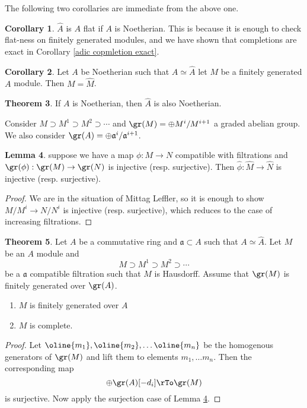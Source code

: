 \documentclass[12 pt]{article}
\theoremstyle{definition}
\newtheorem{thm}{Theorem}[section]
\newtheorem{cor}[thm]{Corollary}
\newtheorem{lemma}[thm]{Lemma}
\renewcommand{\(}{\left(}
\renewcommand{\)}{\right)}
\newcommand\fa{{\mathfrak a}}
\begin{document}
The following two corollaries are immediate from the above one.

\begin{cor}  $\hat{A}$ is $A$ flat if $A$ is Noetherian. This is because it is enough to check flat-ness on finitely generated modules, and we have shown that completions are exact in Corollary \ref{adic copmletion exact}.
\end{cor}


\begin{cor} Let $A$ be Noetherian such that $A \simeq \hat{A}$ let $M$ be a finitely generated $A$ module. Then $M=\hat{M}$.
\end{cor}


\begin{thm} If $A$ is Noetherian, then $\hat{A}$ is also Noetherian.
\end{thm}

Consider $M \supset M^1 \supset M^2 \supset \cdots$ and $\gr(M)=\oplus M^i/M^{i+1}$ a graded abelian group. We also consider $\gr(A)=\oplus \fa^i/\fa^{i+1}$.

\begin{lemma} suppose we have a map $\phi:M \to N$ compatible with filtrations and $\gr(\phi):\gr(M) \to \gr(N)$ is injective (resp. surjective). Then $\hat{\phi}:\hat{M} \to \hat{N}$ is injective (resp. surjective).
\label{gr to completion surj/inj}
\end{lemma}
\begin{proof} We are in the situation of Mittag Leffler, so it is enough to show $M/M^i \to N/N^i$ is injective (resp. surjective), which reduces to the case of increasing filtrations.
\end{proof}

\begin{thm} Let $A$ be a commutative ring and $\fa \subset A$ such that $A \simeq \hat{A}$. Let $M$ be an $A$ module and
\[M \supset M^1 \supset M^2 \supset \cdots\]
be a $\fa$ compatible filtration such that $M$ is Hausdorff. Assume that $\gr(M)$ is finitely generated over $\gr(A)$.
\begin{enumerate}
\item $M$ is finitely generated over $A$

\item $M$ is complete.
\end{enumerate}
\end{thm}

\begin{proof} Let $\oline{m_1}, \oline{m_2}, \ldots \oline{m_n}$ be the homogenous generators of $\gr(M)$ and lift them to elements $m_1, \ldots m_n$. Then the corresponding map
\[\oplus \gr(A)[-d_i] \rTo \gr(M)\]
is surjective. Now apply the surjection case of Lemma \ref{gr to completion surj/inj}.
\end{proof}
\end{document}
